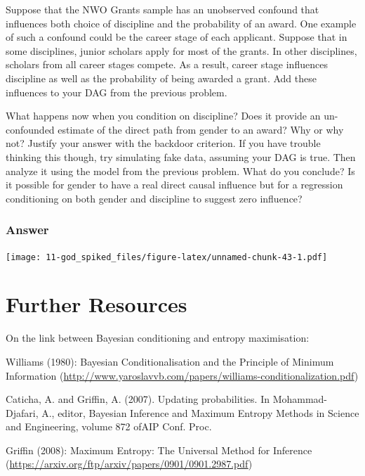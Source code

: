 \documentclass[
]{book}
\begin{document}
Suppose that the NWO Grants sample has an unobserved confound that influences both choice of discipline and the probability of an award. One example of such a confound could be the career stage of each applicant. Suppose that in some disciplines, junior scholars apply for most of the grants. In other disciplines, scholars from all career stages compete. As a result, career stage influences discipline as well as the probability of being awarded a grant. Add these influences to your DAG from the previous problem.

What happens now when you condition on discipline? Does it provide an un-confounded estimate of the direct path from gender to an award? Why or why not? Justify your answer with the backdoor criterion. If you have trouble thinking this though, try simulating fake data, assuming your DAG is true. Then analyze it using the model from the previous problem. What do you conclude? Is it possible for gender to have a real direct causal influence but for a regression conditioning on both gender and discipline to suggest zero influence?

\hypertarget{answer-97}{%
\subsubsection*{Answer}\label{answer-97}}

\texttt{[image: 11-god\_spiked\_files/figure-latex/unnamed-chunk-43-1.pdf]}

\hypertarget{further-resources-1}{%
\section*{Further Resources}\label{further-resources-1}}

On the link between Bayesian conditioning and entropy maximisation:

Williams (1980): Bayesian Conditionalisation and the Principle of Minimum Information (\url{http://www.yaroslavvb.com/papers/williams-conditionalization.pdf})

Caticha, A. and Griffin, A. (2007). Updating probabilities. In Mohammad-Djafari, A., editor, Bayesian Inference and Maximum Entropy Methods in Science and Engineering, volume 872 ofAIP Conf. Proc.

Griffin (2008): Maximum Entropy: The Universal Method for Inference (\url{https://arxiv.org/ftp/arxiv/papers/0901/0901.2987.pdf})
\end{document}

